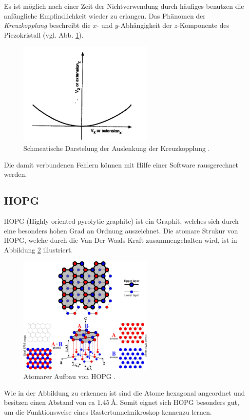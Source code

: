 Es ist möglich nach einer Zeit der Nichtverwendung
durch häufiges benutzen die anfängliche Empfindlichkeit wieder zu erlangen.
Das Phänomen der \emph{Kreuzkopplung} beschreibt die $x$- und $y$-Abhängigkeit der $z$-Komponente des Piezokristall (vgl. Abb. \ref{fig: cross_copeling}).
\begin{figure}[!h]
  \centering
  \includegraphics[width=0.6\textwidth]{./pics/cross_copling.png}
  \caption{Schmeatische Darstelung der Auslenkung der Kreuzkopplung \cite{rtm}.}
  \label{fig: cross_copeling}
\end{figure}
Die damit verbundenen Fehlern können mit Hilfe einer Software rausgerechnet werden.

\subsection{HOPG}
HOPG (Highly oriented pyrolytic graphite) ist ein Graphit, welches sich durch eine besonders hohen Grad
an Ordnung auszeichnet. Die atomare Strukur von HOPG, welche durch die Van Der Waals Kraft zusammengehalten wird,
ist in Abbildung \ref{fig: hopg} illustriert.
\begin{figure}[!h]
  \centering
  \includegraphics[width=0.6\textwidth]{./pics/hopg.jpg}
  \caption{Atomarer Aufbau von HOPG \cite{hopg}.}
  \label{fig: hopg}
\end{figure}
Wie in der Abbildung zu erkennen ist sind die Atome hexagonal angeordnet und besitzen einen Abstand von ca
$\SI{1.45}{\angstrom}$. Somit eignet sich HOPG besonders gut, um die Funktionsweise eines Rastertunnelmikroskop
kennenzu lernen.
